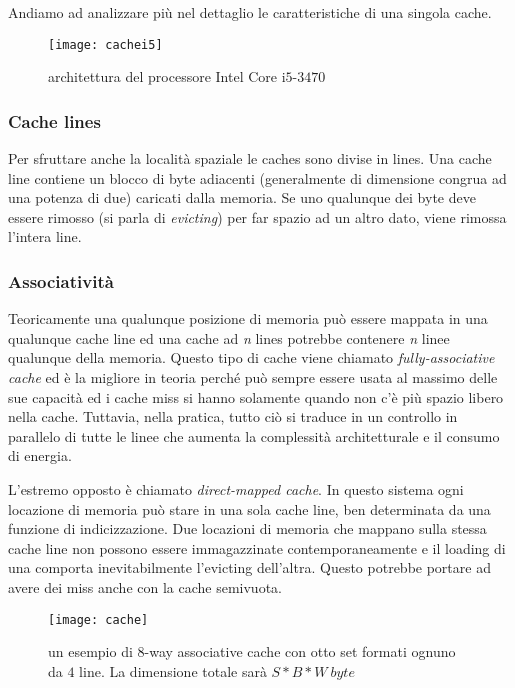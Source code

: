 			Andiamo ad analizzare più nel dettaglio le caratteristiche di una singola cache\cite{ge2016survey,yarom2014flush+}.
			
			\begin{figure}[h]
				\begin{center}
					\texttt{[image: cachei5]}
					\caption{architettura del processore Intel Core i$5$-$3470$}
					\label{fig:cachei5}
				\end{center}
			\end{figure}
			
			\subsubsection{Cache lines}
				Per sfruttare anche la località spaziale le caches sono divise in lines. Una cache line contiene un blocco di byte adiacenti (generalmente di dimensione congrua ad una potenza di due) caricati dalla memoria. Se uno qualunque dei byte deve essere rimosso (si parla di \emph{evicting}) per far spazio ad un altro dato, viene rimossa l'intera line.
				
			\subsubsection{Associatività}
				Teoricamente una qualunque posizione di memoria può essere mappata in una qualunque cache line ed una cache ad \emph{n} lines potrebbe contenere \emph{n} linee qualunque della memoria. Questo tipo di cache viene chiamato \emph{fully-associative cache} ed è la migliore in teoria perché può sempre essere usata al massimo delle sue capacità ed i cache miss si hanno solamente quando non c'è più spazio libero nella cache. Tuttavia, nella pratica, tutto ciò si traduce in un controllo in parallelo di tutte le linee che aumenta la complessità architetturale e il consumo di energia.
				
				L'estremo opposto è chiamato \emph{direct-mapped cache}. In questo sistema ogni locazione di memoria può stare in una sola cache line, ben determinata da una funzione di indicizzazione. Due locazioni di memoria che mappano sulla stessa cache line non possono essere immagazzinate contemporaneamente e il loading di una comporta inevitabilmente l'evicting dell'altra. Questo potrebbe portare ad avere dei miss anche con la cache semivuota.
				
				\begin{figure}
					\begin{center}
						\texttt{[image: cache]}
						\caption[$8$-way associative cache]{un esempio di $8$-way associative cache con otto set formati ognuno da $4$ line. La dimensione totale sarà $S*B*W \ byte$}
						\label{fig:cache}
					\end{center}
				\end{figure}
				
